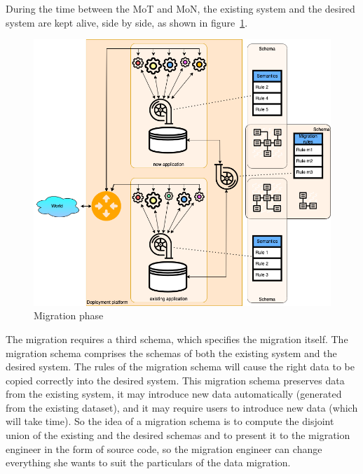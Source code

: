 \documentclass{elsarticle}
\begin{document}
   During the time between the MoT and MoN,
   the existing system and the desired system are kept alive, side by side, as shown in figure~\ref{fig:migration phase}.
\begin{figure}[bht]
   \begin{center}
     \includegraphics[scale=.35]{datamigration-Migration phase.drawio.png}
   \end{center}
\caption{Migration phase}
\label{fig:migration phase}
\end{figure}

   The migration requires a third schema, which specifies the migration itself.
   The migration schema comprises the schemas of both the existing system and the desired system.
   The rules of the migration schema will cause the right data to be copied correctly into the desired system.
   This migration schema preserves data from the existing system, it may introduce new data automatically (generated from the existing dataset),
   and it may require users to introduce new data (which will take time). 
   So the idea of a migration schema is to compute the disjoint union of the existing and the desired schemas
   and to present it to the migration engineer in the form of source code,
   so the migration engineer can change everything she wants to suit the particulars of the data migration.
\end{document}
